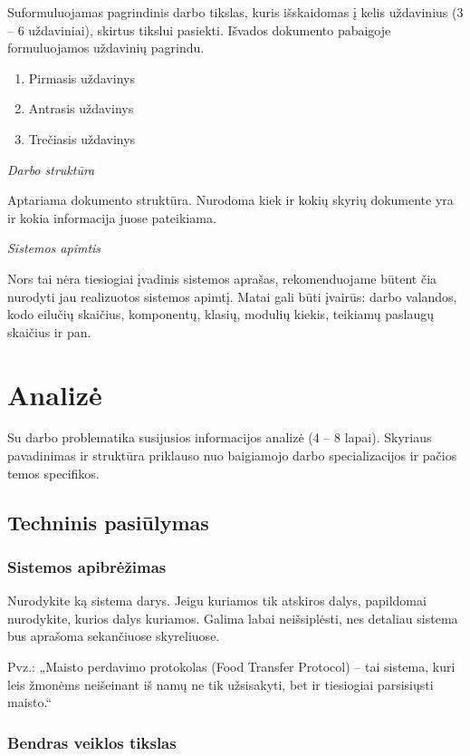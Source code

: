 \documentclass{ktuthesis}
\begin{document}
  Suformuluojamas pagrindinis darbo tikslas, kuris išskaidomas į kelis uždavinius (3 – 6 uždaviniai), skirtus tikslui pasiekti. Išvados dokumento pabaigoje formuluojamos uždavinių pagrindu.
  \begin{enumerate}
    \item Pirmasis uždavinys
    \item Antrasis uždavinys
    \item Trečiasis uždavinys
  \end{enumerate}

  \textit{Darbo struktūra}

  Aptariama dokumento struktūra. Nurodoma kiek ir kokių skyrių dokumente yra ir kokia informacija juose pateikiama.

  \textit{Sistemos apimtis}

  Nors tai nėra tiesiogiai įvadinis sistemos aprašas, rekomenduojame būtent čia nurodyti jau realizuotos sistemos apimtį. Matai gali būti įvairūs: darbo valandos, kodo eilučių skaičius, komponentų, klasių, modulių kiekis, teikiamų paslaugų skaičius ir pan.

  \clearpage

  \section{Analizė}

  Su darbo problematika susijusios informacijos analizė (4 – 8 lapai). Skyriaus pavadinimas ir struktūra priklauso nuo baigiamojo darbo specializacijos ir pačios temos specifikos.

  \subsection{Techninis pasiūlymas}

  \subsubsection{Sistemos apibrėžimas}

  Nurodykite ką sistema darys. Jeigu kuriamos tik atskiros dalys, papildomai nurodykite, kurios dalys kuriamos. Galima labai neišsiplėsti, nes detaliau sistema bus aprašoma sekančiuose skyreliuose.

  Pvz.: „Maisto perdavimo protokolas (Food Transfer Protocol) – tai sistema, kuri leis žmonėms neišeinant iš namų ne tik užsisakyti, bet ir tiesiogiai parsisiųsti maisto.“

  \subsubsection{Bendras veiklos tikslas}
\end{document}
